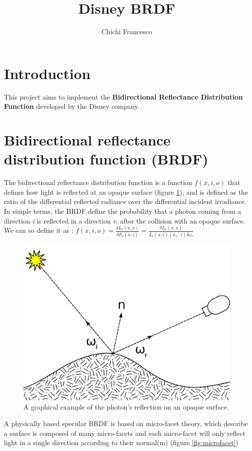 \documentclass[11pt]{article}
\title{Disney BRDF}
\author{Chichi Francesco}
\begin{document}
\maketitle
\graphicspath{{img/}}
\section{Introduction}
	This project aims to implement the \textbf{Bidirectional Reflectance Distribution Function} developed by the Disney company. 

\newpage
\section{Bidirectional reflectance distribution function (BRDF)}
The bidirectional reflectance distribution function is a function $ f(x,i,o) $ that defines how light is reflected at an opaque surface (figure \ref{fig:reflect}), and is defined as the ratio of the differential reflected radiance over the
differential incident irradiance. 
In simple terms, the BRDF define the probability that a photon coming from a direction \textit{i} is reflected in a direction \textit{r}, after the collision with an opaque surface.
We can so define it as \cite{slide}:
$f(x,i,o)=\frac{\delta L_r(x,o)}{\delta E_i(x,i)} = \frac{\delta L_r(x,o)}{L_i(x,i)(n_x\cdot i) \delta \omega_i} $

\begin{figure} [ht]
	\centering
	\includegraphics[width=0.5\linewidth]{img/reflect}
	\caption{A graphical example of the photon's reflection on an opaque surface.}
	\label{fig:reflect}
\end{figure}

A physically based specular BRDF is based on micro-facet theory, which describe a surface is composed of many micro-facets and each micro-facet will only reflect light in a single direction according to their normal(m) (figure \ref{fig:microfacet}) \cite{slide,microfacet} 
\end{document}
